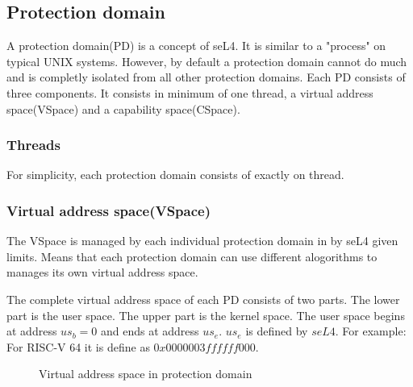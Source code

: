 \subsection{Protection domain}
A protection domain(PD) is a concept of seL4. It is similar to a "process" on typical UNIX systems. 
However, by default a protection domain cannot do much and is completly isolated from all other protection domains.
Each PD consists of three components. It consists in minimum of one thread, a virtual address space(VSpace) and a capability space(CSpace).

\subsubsection{Threads}
For simplicity, each protection domain consists of exactly on thread.

\subsubsection{Virtual address space(VSpace)}
The VSpace is managed by each individual protection domain in by seL4 given limits. Means that each protection domain can use different alogorithms to manages its
own virtual address space.

The complete virtual address space of each PD consists of two parts.
The lower part is the user space. The upper part is the kernel space.
The user space begins at address $us_b = 0$ and ends at address $us_e$. $us_e$ is defined
by $seL4$. For example: For RISC-V 64 it is define as $0x0000003ffffff000$.

\begin{figure}[ht]
    \centering
    \caption{Virtual address space in protection domain}
    \label{fig:vas}
\end{figure}

